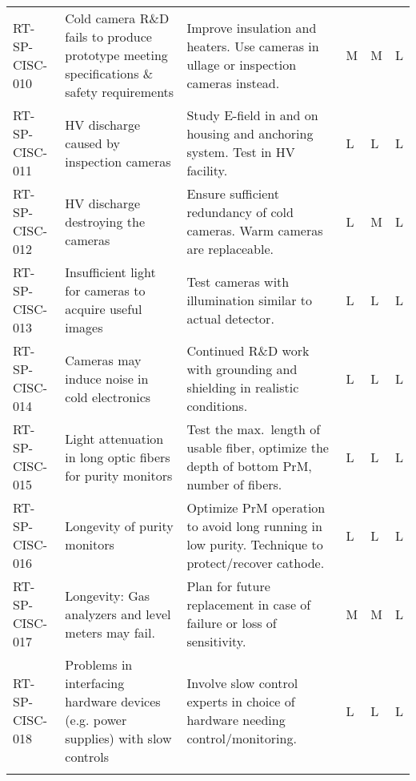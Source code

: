 \begin{longtable}{p{}p{}p{}p{}p{}p{}}
RT-SP-CISC-010 & Cold camera R\&D fails to produce prototype meeting specifications \& safety requirements & Improve insulation and heaters. Use cameras in ullage or inspection cameras instead. & M & M & L \\  \colhline
RT-SP-CISC-011 & HV discharge caused by inspection cameras & Study E-field in and on housing and anchoring system. Test in HV facility. & L & L & L \\  \colhline
RT-SP-CISC-012 & HV discharge destroying the cameras & Ensure sufficient redundancy of cold cameras. Warm cameras are replaceable. & L & M & L \\  \colhline
RT-SP-CISC-013 & Insufficient light for cameras to acquire useful images & Test cameras with illumination similar to actual detector. & L & L & L \\  \colhline
RT-SP-CISC-014 & Cameras may induce noise in cold electronics & Continued R\&D work with grounding and shielding in realistic conditions. & L & L & L \\  \colhline
RT-SP-CISC-015 & Light attenuation in long optic fibers for purity monitors  & Test the max.\ length of usable fiber, optimize the depth of bottom PrM, number of fibers. & L & L & L \\  \colhline
RT-SP-CISC-016 & Longevity of purity monitors & Optimize PrM operation to avoid long running in low purity. Technique to protect/recover cathode. & L & L & L \\  \colhline
RT-SP-CISC-017 & Longevity: Gas analyzers and level meters may fail. & Plan for future replacement in case of failure or loss of sensitivity.  & M & M & L \\  \colhline
RT-SP-CISC-018 & Problems in interfacing  hardware devices (e.g. power supplies) with slow controls & Involve slow control experts in choice of hardware needing control/monitoring.
 & L & L & L \\  \colhline

\label{tab:risks:SP-FD-CISC}
\end{longtable}
